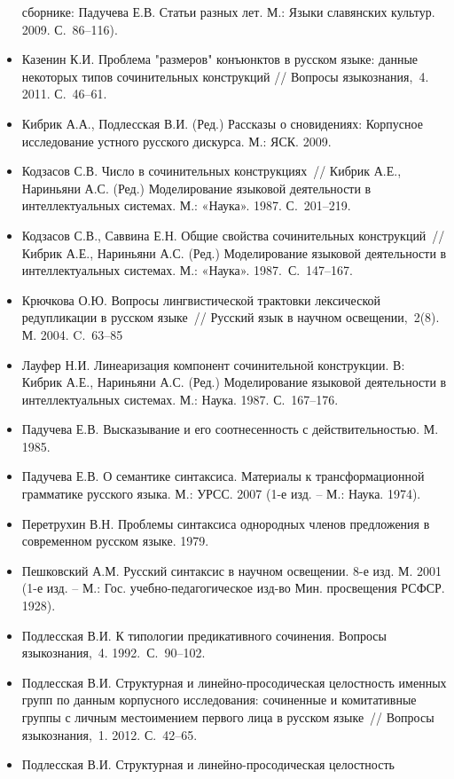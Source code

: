 \begin{itemize}
  сборнике: Падучева Е.В. Статьи разных лет. М.: Языки славянских
  культур. 2009. С.~86--116).
\item
  Казенин К.И. Проблема "размеров" конъюнктов в русском языке: данные
  некоторых типов сочинительных конструкций // Вопросы языкознания,~4.
  2011. С.~46--61.
\item
  Кибрик А.А., Подлесская В.И. (Ред.) Рассказы о сновидениях: Корпусное
  исследование устного русского дискурса. М.: ЯСК. 2009.
\item
  Кодзасов С.В. Число в сочинительных конструкциях~// Кибрик А.Е.,
  Нариньяни А.С. (Ред.) Моделирование языковой деятельности в
  интеллектуальных системах. М.: «Наука». 1987. С.~201--219.
\item
  Кодзасов С.В., Саввина Е.Н. Общие свойства сочинительных
  конструкций~// Кибрик А.Е., Нариньяни А.С. (Ред.) Моделирование
  языковой деятельности в интеллектуальных системах. М.: «Наука».
  1987.~С.~147--167.
\item
  Крючкова О.Ю. Вопросы лингвистической трактовки лексической
  редупликации в русском языке~// Русский язык в научном
  освещении,~2(8). М. 2004. C.~63--85
\item
  Лауфер Н.И. Линеаризация компонент сочинительной конструкции. В:
  Кибрик А.Е., Нариньяни А.С. (Ред.) Моделирование языковой деятельности
  в интеллектуальных системах. М.: Наука. 1987. С.~167--176.
\item
  Падучева Е.В. Высказывание и его соотнесенность с действительностью.
  М. 1985.
\item
  Падучева Е.В. О семантике синтаксиса. Материалы к трансформационной
  грамматике русского языка. М.: УРСС. 2007 (1-е изд. -- М.: Наука.
  1974).
\item
  Перетрухин В.Н. Проблемы синтаксиса однородных членов предложения в
  современном русском языке. 1979.
\item
  Пешковский А.М. Русский синтаксис в научном освещении. 8-е изд. М.
  2001 (1-е изд. -- М.: Гос. учебно-педагогическое изд-во Мин.
  просвещения РСФСР. 1928).
\item
  Подлесская В.И. К типологии предикативного сочинения. Вопросы
  языкознания,~4. 1992.~С.~90--102.
\item
  Подлесская В.И. Структурная и линейно-просодическая целостность
  именных групп по данным корпусного исследования: сочиненные и
  комитативные группы с личным местоимением первого лица в русском
  языке~// Вопросы языкознания,~1. 2012. С.~42--65.
\item
  Подлесская В.И. Структурная и линейно-просодическая целостность

\end{itemize}

